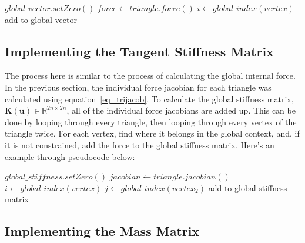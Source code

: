 \documentclass[twocolumn,10pt]{asme2ej}
\begin{document}
\begin{algorithmic}[1]
        \State $global\_vector.setZero()$
         \State $force \gets triangle.force()$
                  \State $i \gets global\_index(vertex)$
                  \State add to global vector
              \EndIf
            \EndFor
        \EndFor
    \EndFunction
\end{algorithmic}

\subsection{Implementing the Tangent Stiffness Matrix}

The process here is similar to the process of calculating the global internal force. In the previous section, the individual force jacobian for each triangle was calculated using equation~\ref{eq_trijacob}. To calculate the global stiffness matrix, $\bm{K}(\bm{u}) \in \mathbb{R}^{2n \times 2n}$, all of the individual force jacobians are added up. This can be done by looping through every triangle, then looping through every vertex of the triangle twice. For each vertex, find where it belongs in the global context, and, if it is not constrained, add the force to the global stiffness matrix. Here's an example through pseudocode below:

\begin{algorithmic}[1]
        \State $global\_stiffness.setZero()$
         \State $jacobian \gets triangle.jacobian()$
                  \State $i \gets global\_index(vertex)$
                          \State $j \gets global\_index(vertex_2)$
                          \State add to global stiffness matrix
                      \EndIf
                    \EndFor
              \EndIf
            \EndFor
        \EndFor
    \EndFunction
\end{algorithmic}

\subsection{Implementing the Mass Matrix}
\end{document}
